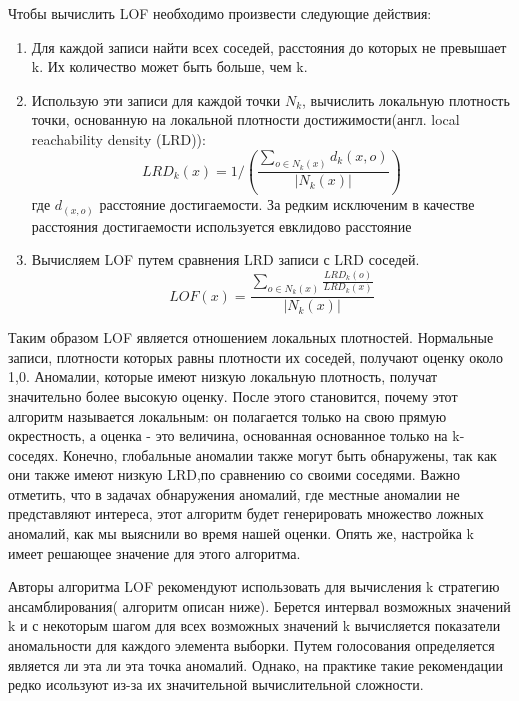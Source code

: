 Чтобы вычислить LOF необходимо произвести следующие действия:
\begin{enumerate}
\item Для каждой записи найти всех соседей, расстояния до которых не превышает k. Их количество может быть больше, чем k.
\item Использую эти записи для каждой точки $N_k$, вычислить локальную плотность точки, основанную на локальной плотности достижимости(англ. local reachability density (LRD)):
\begin{equation}
LRD_k(x) = 1/(\frac{\sum_{o \in N_k(x)}d_k (x,o)}{|N_k (x)|})
\end{equation}
где $d_(x,o)$ расстояние достигаемости. За редким исключеним в качестве расстояния достигаемости используется евклидово расстояние \cite{Book12}
\item Вычисляем LOF путем сравнения LRD записи с LRD соседей.
\begin{equation}
LOF(x) = \frac{\sum_{o \in N_k(x)}\frac{LRD_k (o)}{LRD_k (x)}}{|N_k (x)|}
\end{equation}
\end{enumerate}
Таким образом LOF является отношением локальных плотностей.  Нормальные записи, плотности которых равны плотности их соседей, получают оценку около 1,0. Аномалии, которые имеют низкую локальную плотность, получат значительно более высокую оценку. После этого становится, почему этот алгоритм называется локальным: он полагается только на свою прямую окрестность, а оценка - это величина, основанная основанное только на k-соседях. Конечно, глобальные аномалии также могут быть обнаружены, так как они также имеют низкую LRD,по сравнению со своими соседями. Важно отметить, что в задачах обнаружения аномалий, где местные аномалии не представляют интереса, этот алгоритм будет генерировать множество ложных аномалий, как мы выяснили во время нашей оценки. Опять же, настройка k имеет решающее значение для этого алгоритма.

Авторы алгоритма LOF рекомендуют использовать для вычисления k стратегию ансамблирования( алгоритм описан ниже). Берется интервал возможных значений k и с некоторым шагом для всех возможных значений k вычисляется показатели аномальности для каждого элемента выборки. Путем голосования определяется является ли эта ли эта точка аномалий. Однако, на практике такие рекомендации редко исользуют из-за их значительной вычислительной сложности.

